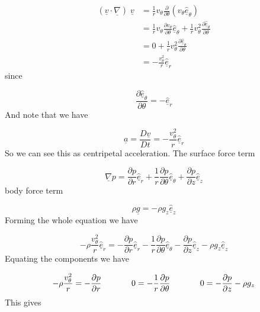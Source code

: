 \begin{equation*}
  \begin{split}
    (\underline{v}\cdot\underline{\nabla})\;\underline{v}
    &=\frac{1}{r}v_{\theta}\frac{\partial}{\partial\theta}(v_{\theta}\hat{\underline{e}}_{\theta}) \\
    &=\frac{1}{r}v_{\theta}\frac{\partial{}v_{\theta}}{\partial\theta}\hat{\underline{e}}_{\theta}+\frac{1}{r}v_{\theta}^{2}\frac{\partial\hat{\underline{e}}_{\theta}}{\partial\theta} \\
    &=0+\frac{1}{r}v_{\theta}^{2}\frac{\partial\hat{\underline{e}}_{\theta}}{\partial\theta} \\
    &=-\frac{v_{\theta}^{2}}{r}\hat{\underline{e}}_{r}
  \end{split}
\end{equation*}
since

\begin{equation*}
  \frac{\partial\hat{\underline{e}}_{\theta}}{\partial\theta}=-\hat{\underline{e}}_{r}
\end{equation*}
And note that we have

\begin{equation*}
  \underline{a}=\frac{D\underline{v}}{Dt}=-\frac{v_{\theta}^{2}}{r}\hat{\underline{e}}_{r}
\end{equation*}
So we can see this as centripetal acceleration.
The surface force term

\begin{equation*}
  \underline{\nabla}p=\frac{\partial{}p}{\partial{}r}\hat{\underline{e}}_{r}+\frac{1}{r}\frac{\partial{}p}{\partial\theta}\hat{\underline{e}}_{\theta}+\frac{\partial{}p}{\partial{}z}\hat{\underline{e}}_{z}
\end{equation*}
body force term

\begin{equation*}
  \rho\underline{g}=-\rho{}g_{z}\hat{\underline{e}}_{z}
\end{equation*}
Forming the whole equation we have

\begin{equation*}
  -\rho\frac{v_{\theta}^{2}}{r}\hat{\underline{e}}_{r}=-\frac{\partial{}p}{\partial{}r}\hat{\underline{e}}_{r}-\frac{1}{r}\frac{\partial{}p}{\partial\theta}\hat{\underline{e}}_{\theta}-\frac{\partial{}p}{\partial{}z}\hat{\underline{e}}_{z}-\rho{}g_{z}\hat{\underline{e}}_{z}
\end{equation*}
Equating the components we have

\begin{equation*}
  -\rho\frac{v_{\theta}^{2}}{r}=-\frac{\partial{}p}{\partial{}r}
  \hspace{0.5in}
  0=-\frac{1}{r}\frac{\partial{}p}{\partial\theta}
  \hspace{0.5in}
  0=-\frac{\partial{}p}{\partial{}z}-\rho{}g_{z}
\end{equation*}
This gives

